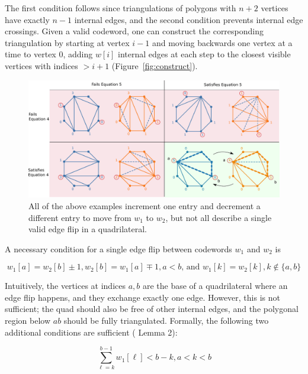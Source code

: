 \documentclass[english]{socg-lipics-v2021}
\begin{document}
The first condition follows since triangulations of polygons with $n+2$ vertices have exactly $n-1$ internal edges, and the second condition prevents internal edge crossings.   Given a valid codeword, one can construct the corresponding triangulation by starting at vertex $i-1$ and moving backwards one vertex at a time to vertex $0$, adding $w[i]$ internal edges at each step to the closest visible vertices with indices $> i+1$ (Figure~\ref{fig:construct}).

\begin{figure}
    \centering
    \includegraphics[width=\textwidth]{RotationExamples.pdf}
    \caption{All of the above examples increment one entry and decrement a different entry to move from $w_1$ to $w_2$, but not all describe a single valid edge flip in a quadrilateral.}
    \label{fig:rotexamples}
\end{figure}


A necessary condition for a single edge flip between codewords $w_1$ and $w_2$ is

\begin{equation}
    \label{eq:rot1}
    w_1[a] = w_2[b] \pm 1, w_2[b] = w_1[a] \mp 1, a < b \text{, and }  w_1[k] = w_2[k], k \notin \{a, b\}
\end{equation}

Intuitively, the vertices at indices $a, b$ are the base of a quadrilateral where an edge flip happens, and they exchange exactly one edge.  However, this is not sufficient; the quad should also be free of other internal edges, and the polygonal region below $ab$ should be fully triangulated.  Formally, the following two additional conditions are sufficient (\cite{lucas1987rotation} Lemma 2):

\begin{equation}
    \label{eq:rot2}
    \sum_{\ell = k}^{b-1}  w_1[\ell] < b-k, a < k < b
\end{equation}
\end{document}
